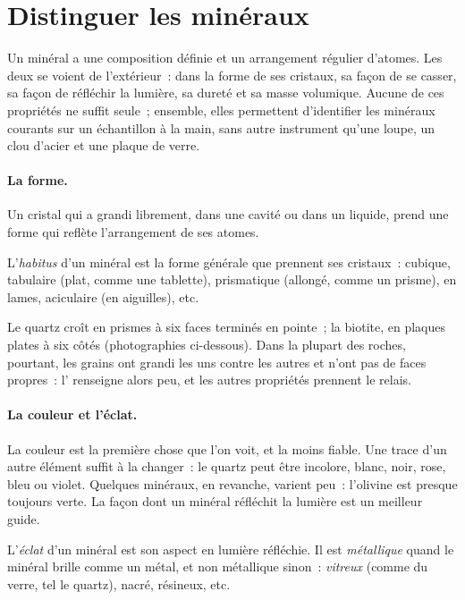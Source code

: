 \section{Distinguer les minéraux}

Un minéral a une composition définie et un arrangement régulier d'atomes.
Les deux se voient de l'extérieur~: dans la forme de ses cristaux, sa façon
de se casser, sa façon de réfléchir la lumière, sa dureté et sa masse
volumique. Aucune de ces propriétés ne suffit seule~; ensemble, elles
permettent d'identifier les minéraux courants sur un échantillon à la main,
sans autre instrument qu'une loupe, un clou d'acier et une plaque de verre.

\paragraph{La forme.} Un cristal qui a grandi librement, dans une cavité ou
dans un liquide, prend une forme qui reflète l'arrangement de ses atomes.

\begin{definition}[Habitus]\label{def:g11:minerals:habit}
L'\emph{habitus} d'un minéral est la forme
générale que prennent ses cristaux~: cubique, tabulaire (plat, comme une
tablette), prismatique (allongé, comme un prisme), en lames, aciculaire (en
aiguilles), etc.
\end{definition}

Le quartz croît en prismes à six faces terminés en pointe~; la biotite, en
plaques plates à six côtés (photographies ci-dessous). Dans la plupart des
roches, pourtant, les grains ont grandi les uns contre les autres et n'ont
pas de faces propres~: l' renseigne alors peu, et les autres
propriétés prennent le relais.

\paragraph{La couleur et l'éclat.} La couleur est la première chose que l'on
voit, et la moins fiable. Une trace d'un autre élément suffit à la changer~:
le quartz peut être incolore, blanc, noir, rose, bleu ou violet. Quelques
minéraux, en revanche, varient peu~: l'olivine est presque toujours verte.
La façon dont un minéral réfléchit la lumière est un meilleur guide.

\begin{definition}[Éclat]\label{def:g11:minerals:lustre}
L'\emph{éclat} d'un minéral est son aspect en lumière
réfléchie. Il est \emph{métallique} quand le minéral brille comme un métal,
et non métallique sinon~: \emph{vitreux} (comme du verre, tel le quartz),
nacré, résineux, etc.
\end{definition}

